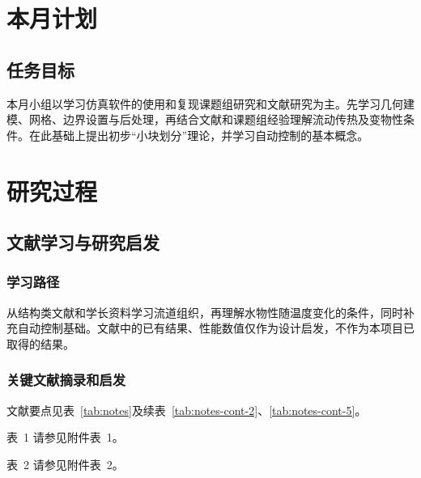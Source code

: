 \documentclass[stage1,fontset=fandol]{ydzjreport}
\makeatletter
\newcommand{\submissionnumber}[1]{\def\@currentlabel{#1}}
\makeatother
\begin{document}
\makestageonehead

\section{本月计划}

\subsection{任务目标}

本月小组以学习仿真软件的使用和复现课题组研究和文献研究为主。先学习几何建模、网格、边界设置与后处理，再结合文献和课题组经验理解流动传热及变物性条件。在此基础上提出初步“小块划分”理论，并学习自动控制的基本概念。

\section{研究过程}

\subsection{文献学习与研究启发}

\subsubsection{学习路径}

从结构类文献和学长资料学习流道组织，再理解水物性随温度变化的条件，同时补充自动控制基础。文献中的已有结果、性能数值仅作为设计启发，不作为本项目已取得的结果。

\subsubsection{关键文献摘录和启发}
文献要点见表~\ref{tab:notes}及续表~\ref{tab:notes-cont-2}、\ref{tab:notes-cont-5}。




\par\noindent \begingroup\submissionnumber{1}\label{tab:notes}\endgroup 表~1 请参见附件表~1。\par



\par\noindent \begingroup\submissionnumber{2}\label{tab:notes-cont-2}\endgroup 表~2 请参见附件表~2。\par
\end{document}
